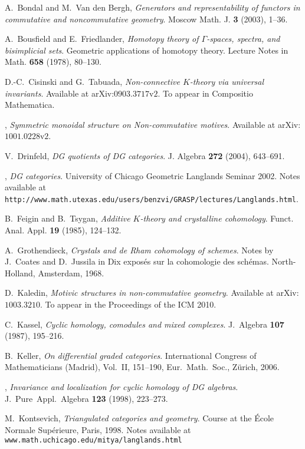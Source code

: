 \documentclass{amsart}
\numberwithin{equation}{subsection}
\theoremstyle{remark}
\theoremstyle{remark}
\theoremstyle{remark}
\theoremstyle{remark}
\begin{document}
\begin{thebibliography}{00}

 A.~Bondal and M.~Van den Bergh, {\em Generators and representability of functors in commutative and noncommutative geometry}. Moscow Math. J. {\bf 3} (2003), 1--36.  

 A.~Bousfield and E.~Friedlander, {\em Homotopy theory of $\Gamma $-spaces, spectra, and bisimplicial sets}. Geometric applications of homotopy theory. Lecture Notes in Math. {\bf 658} (1978), 80--130. 

 D.-C.~Cisinski and G.~Tabuada, {\em Non-connective $K$-theory via universal invariants}.
Available at arXiv:$0903.3717\textrm{v}2$. To appear in Compositio Mathematica.
 
 \bysame, {\em Symmetric monoidal structure on Non-commutative motives}.
Available at arXiv:$1001.0228\textrm{v}2$.

 V.~Drinfeld, {\em DG quotients of DG categories}.
J. Algebra {\bf 272} (2004), 643--691.

 \bysame, {\em DG categories}. University of Chicago Geometric Langlands Seminar 2002. Notes available at {\tt http://www.math.utexas.edu/users/benzvi/GRASP/lectures/Langlands.html}.

 B.~Feigin and B.~Tsygan, {\em Additive $K$-theory and crystalline cohomology}. Funct. Anal. Appl. {\bf 19} (1985), 124--132.

 A.~Grothendieck, {\em Crystals and de Rham cohomology of schemes}. Notes by J.~Coates and D.~Jussila in Dix expos{\'e}s sur la cohomologie des sch{\'e}mas. North-Holland, Amsterdam, 1968.

 D.~Kaledin, {\em Motivic structures in non-commutative geometry}. Available at arXiv:$1003.3210$. To appear in the Proceedings of the ICM 2010.

 C.~Kassel, {\em Cyclic homology, comodules and mixed
    complexes}. J.~Algebra {\bf 107} (1987), 195--216.

 B.~Keller, {\em On differential graded
    categories}. International Congress of Mathematicians (Madrid), Vol.~II,
  151--190, Eur.~Math.~Soc., Z{\"u}rich, 2006.

 \bysame, {\em Invariance and localization for cyclic homology of DG algebras}. J.~Pure~Appl.~Algebra {\bf 123} (1998), 223--273.

 M.~Kontsevich, {\em Triangulated categories and
    geometry}. Course at the {\'E}cole Normale Sup{\'e}rieure, Paris, 1998. Notes available at {\tt www.math.uchicago.edu/mitya/langlands.html}
    

\end{thebibliography}
\end{document}

